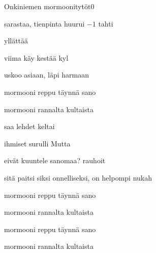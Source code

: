 \documentclass[12pt,a4paper]{article}
\begin{document}
\thispagestyle{empty}
\begin{mysong}{Onkiniemen mormoonitytöt}{0}

\begin{SBVerse}
   sarastaa,  tienpinta huurui
  {\SBLyricNoteFont $-1$ tahti}

   yllättää  

   viima käy   kestää
  kyl 

   uskoo asiaan,   läpi harmaan
   
\end{SBVerse}

\begin{SBChorus}
   mormooni  reppu täynnä
  sano 

   mormooni  rannalta kultaista
   
\end{SBChorus}

\begin{SBVerse}
   saa  lehdet  keltai

   ihmiset surulli Mutta  

   eivät kuuntele  sanomaa? 
  rauhoit 

   sitä paitsi siksi  onnelliseksi,  on
  helpompi nukah 
\end{SBVerse}

\begin{SBChorus}
   mormooni  reppu täynnä
  sano 

   mormooni  rannalta kultaista
   
\end{SBChorus}


\begin{SBChorus}
   mormooni  reppu täynnä
  sano 

   mormooni  rannalta kultaista
   
\end{SBChorus}



\end{mysong}
\end{document}
